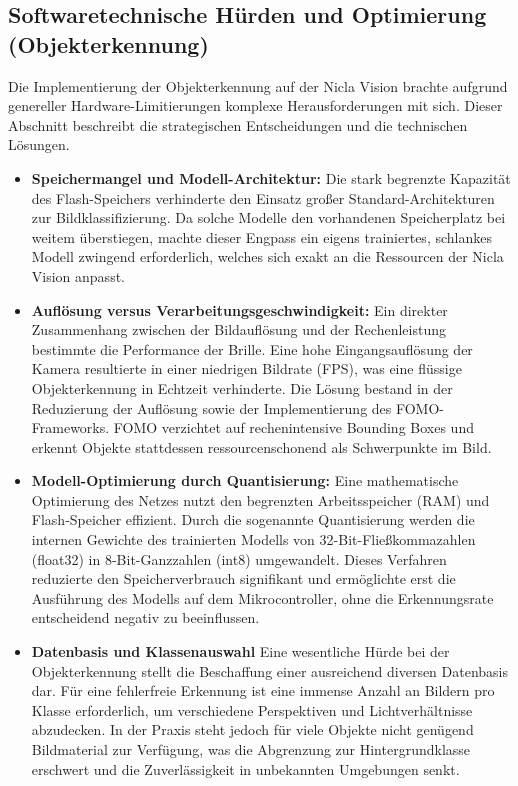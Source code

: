 \subsection{Softwaretechnische Hürden und Optimierung (Objekterkennung)}
Die Implementierung der Objekterkennung auf der Nicla Vision brachte aufgrund genereller Hardware-Limitierungen komplexe Herausforderungen mit sich. Dieser Abschnitt beschreibt die strategischen Entscheidungen und die technischen Lösungen.

\begin{itemize}
    \item \textbf{Speichermangel und Modell-Architektur:} Die stark begrenzte Kapazität des Flash-Speichers verhinderte den Einsatz großer Standard-Architekturen zur Bildklassifizierung. Da solche Modelle den vorhandenen Speicherplatz bei weitem überstiegen, machte dieser Engpass ein eigens trainiertes, schlankes Modell zwingend erforderlich, welches sich exakt an die Ressourcen der Nicla Vision anpasst.
    
    \item \textbf{Auflösung versus Verarbeitungsgeschwindigkeit:} Ein direkter Zusammenhang zwischen der Bildauflösung und der Rechenleistung bestimmte die Performance der Brille. Eine hohe Eingangsauflösung der Kamera resultierte in einer niedrigen Bildrate (FPS), was eine flüssige Objekterkennung in Echtzeit verhinderte. Die Lösung bestand in der Reduzierung der Auflösung sowie der Implementierung des FOMO-Frameworks. FOMO verzichtet auf rechenintensive Bounding Boxes und erkennt Objekte stattdessen ressourcenschonend als Schwerpunkte im Bild.
    
    \item \textbf{Modell-Optimierung durch Quantisierung:} Eine mathematische Optimierung des Netzes nutzt den begrenzten Arbeitsspeicher (RAM) und Flash-Speicher effizient. Durch die sogenannte Quantisierung werden die internen Gewichte des trainierten Modells von 32-Bit-Fließkommazahlen (float32) in 8-Bit-Ganzzahlen (int8) umgewandelt. Dieses Verfahren reduzierte den Speicherverbrauch signifikant und ermöglichte erst die Ausführung des Modells auf dem Mikrocontroller, ohne die Erkennungsrate entscheidend negativ zu beeinflussen.

      \item \textbf{Datenbasis und Klassenauswahl} Eine wesentliche Hürde bei der Objekterkennung stellt die Beschaffung einer ausreichend diversen Datenbasis dar. Für eine fehlerfreie Erkennung ist eine immense Anzahl an Bildern pro Klasse erforderlich, um verschiedene Perspektiven und Lichtverhältnisse abzudecken. In der Praxis steht jedoch für viele Objekte nicht genügend Bildmaterial zur Verfügung, was die Abgrenzung zur Hintergrundklasse erschwert und die Zuverlässigkeit in unbekannten Umgebungen senkt.


\end{itemize}
